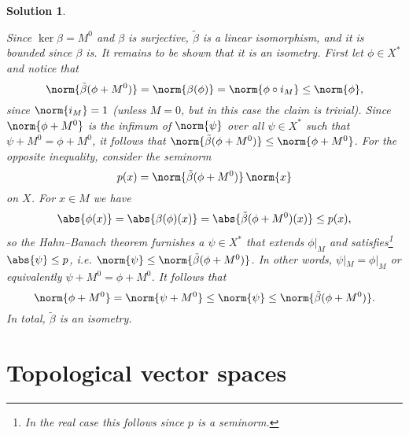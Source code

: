 \documentclass[article, a4paper, 11pt, oneside]{memoir}
\numberwithin{equation}{chapter}
\theoremstyle{nonumberplain}
\newtheorem{solution}{Solution}
\begin{document}
\begin{solution}
\begin{solutionsec}
	\item Since $\ker\beta = M^0$ and $\beta$ is surjective, $\tilde{\beta}$ is a linear isomorphism, and it is bounded since $\beta$ is. It remains to be shown that it is an isometry. First let $\phi \in X^*$ and notice that
	\begin{equation*}
		\norm{ \tilde{\beta}(\phi + M^0) }
			= \norm{\beta(\phi)}
			= \norm{\phi \circ i_M}
			\leq \norm{\phi},
	\end{equation*}
	since $\norm{i_M} = 1$ (unless $M = 0$, but in this case the claim is trivial). Since $\norm{\phi + M^0}$ is the infimum of $\norm{\psi}$ over all $\psi \in X^*$ such that $\psi + M^0 = \phi + M^0$, it follows that $\norm{ \tilde{\beta}(\phi + M^0) } \leq \norm{\phi + M^0}$. For the opposite inequality, consider the seminorm
	\begin{equation*}
		p(x) = \norm{\tilde{\beta}(\phi + M^0)} \, \norm{x}
	\end{equation*}
	on $X$. For $x \in M$ we have
	\begin{equation*}
		\abs{\phi(x)}
			= \abs{\beta(\phi)(x)}
			= \abs{\tilde{\beta}(\phi + M^0)(x)}
			\leq p(x),
	\end{equation*}
	so the Hahn--Banach theorem furnishes a $\psi \in X^*$ that extends $\phi|_M$ and satisfies\footnote{In the real case this follows since $p$ is a seminorm.} $\abs{\psi} \leq p$, i.e. $\norm{\psi} \leq \norm{\tilde{\beta}(\phi + M^0)}$. In other words, $\psi|_M = \phi|_M$ or equivalently $\psi + M^0 = \phi + M^0$. It follows that
	\begin{equation*}
		\norm{\phi + M^0}
			= \norm{\psi + M^0}
			\leq \norm{\psi}
			\leq \norm{\tilde{\beta}(\phi + M^0)}.
	\end{equation*}
	In total, $\tilde{\beta}$ is an isometry.
\end{solutionsec}
\end{solution}


\addtocounter{section}{1}
\section{Topological vector spaces}
\end{document}
